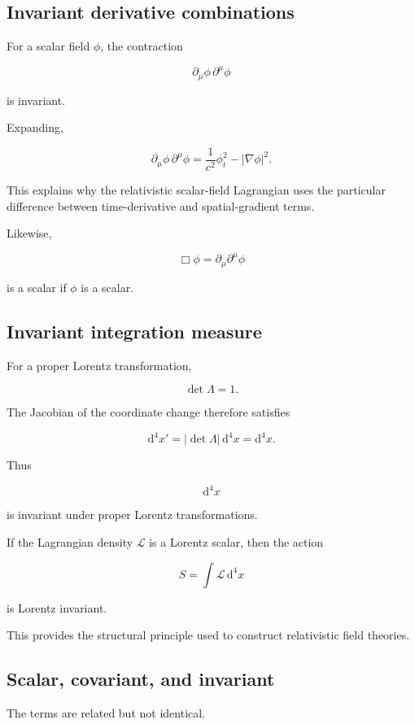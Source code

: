 \subsection{Invariant derivative combinations}

For a scalar field \(\phi\), the contraction

\[
\boxed{
\partial_{\mu}\phi\,
\partial^{\mu}\phi
}
\]

is invariant.

Expanding,

\[
\partial_{\mu}\phi\,
\partial^{\mu}\phi
=
\frac{1}{c^{2}}
\phi_{t}^{2}
-
|\nabla\phi|^{2}.
\]

This explains why the relativistic scalar-field Lagrangian uses the particular difference between time-derivative and spatial-gradient terms.

Likewise,

\[
\boxed{
\Box\phi
=
\partial_{\mu}\partial^{\mu}\phi
}
\]

is a scalar if \(\phi\) is a scalar.

\subsection{Invariant integration measure}

For a proper Lorentz transformation,

\[
\det\Lambda=1.
\]

The Jacobian of the coordinate change therefore satisfies

\[
\mathrm{d}^{4}x'
=
|\det\Lambda|\,\mathrm{d}^{4}x
=
\mathrm{d}^{4}x.
\]

Thus

\[
\boxed{
\mathrm{d}^{4}x
}
\]

is invariant under proper Lorentz transformations.

If the Lagrangian density \(\mathcal{L}\) is a Lorentz scalar, then the action

\[
S
=
\int\mathcal{L}\,\mathrm{d}^{4}x
\]

is Lorentz invariant.

This provides the structural principle used to construct relativistic field theories.

\subsection{Scalar, covariant, and invariant}

The terms are related but not identical.

